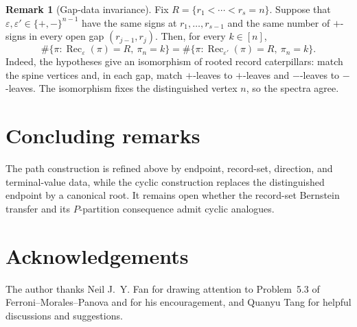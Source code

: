 \documentclass[11pt,letterpaper,reqno]{amsart}
\theoremstyle{definition}
\newtheorem{example}[theorem]{Example}
\newtheorem{remark}[theorem]{Remark}
\newcommand{\eps}{\varepsilon}
\begin{document}
\begin{remark}[Gap-data invariance]\label{cor:block-count-invariance}
Fix \(R=\{r_1<\cdots<r_s=n\}\).  Suppose that
\(\eps,\eps'\in\{+,-\}^{n-1}\) have the same signs at
\(r_1,\ldots,r_{s-1}\) and the same number of \(+\)-signs in every open gap
\((r_{j-1},r_j)\).  Then, for every \(k\in[n]\),
\[
\#\{\pi:\operatorname{Rec}_\eps(\pi)=R,\ \pi_n=k\}
=
\#\{\pi:\operatorname{Rec}_{\eps'}(\pi)=R,\ \pi_n=k\}.
\]
Indeed, the hypotheses give an isomorphism of rooted record caterpillars:
match the spine vertices and, in each gap, match \(+\)-leaves to \(+\)-leaves
and \(-\)-leaves to \(-\)-leaves.  The isomorphism fixes the distinguished
vertex \(n\), so the spectra agree.
\end{remark}


\section{Concluding remarks}

The path construction is refined above by endpoint, record-set, direction,
and terminal-value data, while the cyclic construction replaces the
distinguished endpoint by a canonical root.  It remains open whether the
record-set Bernstein transfer and its \(P\)-partition consequence admit
cyclic analogues.

\section*{Acknowledgements}
The author thanks Neil J.~Y. Fan for drawing attention to Problem~5.3 of
Ferroni--Morales--Panova and for his encouragement, and Quanyu Tang for helpful
discussions and suggestions.
\end{document}
